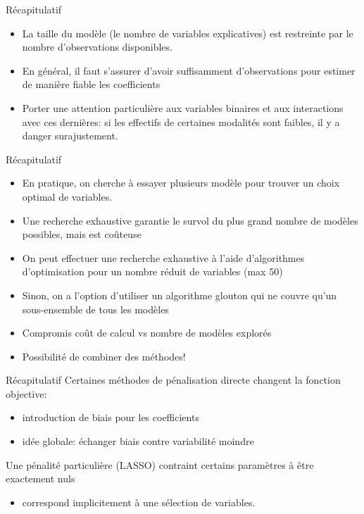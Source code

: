 \documentclass[
  ignorenonframetext,
]{beamer}
\providecommand{\tightlist}{%
  \setlength{\itemsep}{0pt}\setlength{\parskip}{0pt}}\usepackage{longtable,booktabs,array}
\begin{document}
\begin{frame}{Récapitulatif}
\protect\hypertarget{ruxe9capitulatif-1}{}
\begin{itemize}
\tightlist
\item
  La taille du modèle (le nombre de variables explicatives) est
  restreinte par le nombre d'observations disponibles.
\item
  En général, il faut s'assurer d'avoir suffisamment d'observations pour
  estimer de manière fiable les coefficients
\item
  Porter une attention particulière aux variables binaires et aux
  interactions avec ces dernières: si les effectifs de certaines
  modalités sont faibles, il y a danger surajustement.
\end{itemize}
\end{frame}

\begin{frame}{Récapitulatif}
\protect\hypertarget{ruxe9capitulatif-2}{}
\begin{itemize}
\tightlist
\item
  En pratique, on cherche à essayer plusieurs modèle pour trouver un
  choix optimal de variables.
\item
  Une recherche exhaustive garantie le survol du plus grand nombre de
  modèles possibles, mais est coûteuse
\item
  On peut effectuer une recherche exhaustive à l'aide d'algorithmes
  d'optimisation pour un nombre réduit de variables (max 50)
\item
  Sinon, on a l'option d'utiliser un algorithme glouton qui ne couvre
  qu'un sous-ensemble de tous les modèles
\item
  Compromis coût de calcul vs nombre de modèles explorés
\item
  Possibilité de combiner des méthodes!
\end{itemize}
\end{frame}

\begin{frame}{Récapitulatif}
\protect\hypertarget{ruxe9capitulatif-3}{}
Certaines méthodes de pénalisation directe changent la fonction
objective:

\begin{itemize}
\tightlist
\item
  introduction de biais pour les coefficients
\item
  idée globale: échanger biais contre variabilité moindre
\end{itemize}

Une pénalité particulière (LASSO) contraint certains paramètres à être
exactement nuls

\begin{itemize}
\tightlist
\item
  correspond implicitement à une sélection de variables.
\end{itemize}
\end{frame}
\end{document}
